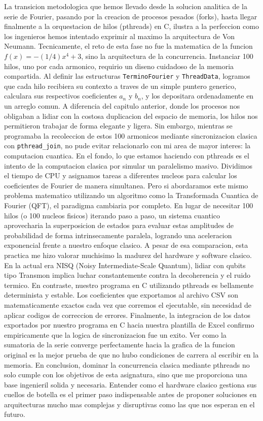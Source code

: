 La transicion metodologica que hemos llevado desde la solucion analitica de la serie de Fourier, pasando por la creacion de procesos pesados (forks), hasta llegar finalmente a la orquestacion de hilos (pthreads) en C, ilustra a la perfeccion como los ingenieros hemos intentado exprimir al maximo la arquitectura de Von Neumann.
Tecnicamente, el reto de esta fase no fue la matematica de la funcion $f(x) = -(1/4)x^4 + 3$, sino la arquitectura de la concurrencia. Instanciar 100 hilos, uno por cada armonico, requirio un diseno cuidadoso de la memoria compartida. Al definir las estructuras \texttt{TerminoFourier} y \texttt{ThreadData}, logramos que cada hilo recibiera su contexto a traves de un simple puntero generico, calculara sus respectivos coeficientes $a_n$ y $b_n$, y los depositara ordenadamente en un arreglo comun. A diferencia del capitulo anterior, donde los procesos nos obligaban a lidiar con la costosa duplicacion del espacio de memoria, los hilos nos permitieron trabajar de forma elegante y ligera.
Sin embargo, mientras se programaba la recoleccion de estos 100 armonicos mediante sincronizacion clasica con \texttt{pthread\_join}, no pude evitar relacionarlo con mi area de mayor interes: la computacion cuantica. En el fondo, lo que estamos haciendo con pthreads es el intento de la computacion clasica por simular un paralelismo masivo. Dividimos el tiempo de CPU y asignamos tareas a diferentes nucleos para calcular los coeficientes de Fourier de manera simultanea. Pero si abordaramos este mismo problema matematico utilizando un algoritmo como la Transformada Cuantica de Fourier (QFT), el paradigma cambiaria por completo. En lugar de necesitar 100 hilos (o 100 nucleos fisicos) iterando paso a paso, un sistema cuantico aprovecharia la superposicion de estados para evaluar estas amplitudes de probabilidad de forma intrinsecamente paralela, logrando una aceleracion exponencial frente a nuestro enfoque clasico.
A pesar de esa comparacion, esta practica me hizo valorar muchisimo la madurez del hardware y software clasico. En la actual era NISQ (Noisy Intermediate-Scale Quantum), lidiar con qubits tipo Transmon implica luchar constantemente contra la decoherencia y el ruido termico. En contraste, nuestro programa en C utilizando pthreads es bellamente determinista y estable. Los coeficientes que exportamos al archivo CSV son matematicamente exactos cada vez que corremos el ejecutable, sin necesidad de aplicar codigos de correccion de errores.
Finalmente, la integracion de los datos exportados por nuestro programa en C hacia nuestra plantilla de Excel confirmo empiricamente que la logica de sincronizacion fue un exito. Ver como la sumatoria de la serie converge perfectamente hacia la grafica de la funcion original es la mejor prueba de que no hubo condiciones de carrera al escribir en la memoria. En conclusion, dominar la concurrencia clasica mediante pthreads no solo cumple con los objetivos de esta asignatura, sino que me proporciona una base ingenieril solida y necesaria. Entender como el hardware clasico gestiona sus cuellos de botella es el primer paso indispensable antes de proponer soluciones en arquitecturas mucho mas complejas y disruptivas como las que nos esperan en el futuro.


